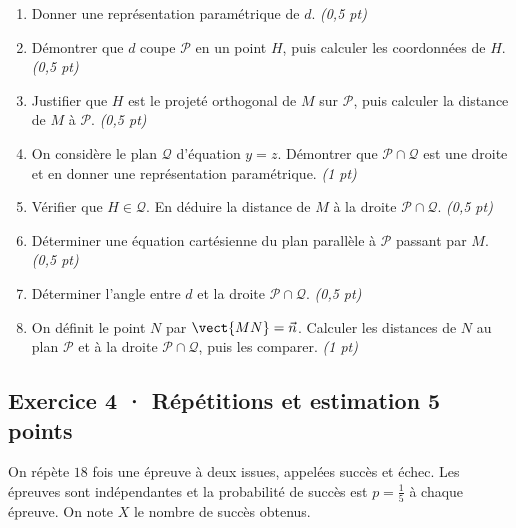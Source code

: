 \begin{enumerate}

\item Donner une représentation paramétrique de $d$. \hfill\textit{(0{,}5 pt)}

\item Démontrer que $d$ coupe $\mathcal P$ en un point $H$, puis calculer les coordonnées de $H$. \hfill\textit{(0{,}5 pt)}

\item Justifier que $H$ est le projeté orthogonal de $M$ sur $\mathcal P$, puis calculer la distance de $M$ à $\mathcal P$. \hfill\textit{(0{,}5 pt)}

\item On considère le plan $\mathcal Q$ d'équation $y=z$. Démontrer que $\mathcal P\cap\mathcal Q$ est une droite et en donner une représentation paramétrique. \hfill\textit{(1 pt)}

\item Vérifier que $H\in\mathcal Q$. En déduire la distance de $M$ à la droite $\mathcal P\cap\mathcal Q$. \hfill\textit{(0{,}5 pt)}

\item Déterminer une équation cartésienne du plan parallèle à $\mathcal P$ passant par $M$. \hfill\textit{(0{,}5 pt)}

\item Déterminer l'angle entre $d$ et la droite $\mathcal P\cap\mathcal Q$. \hfill\textit{(0{,}5 pt)}

\item On définit le point $N$ par $\vect{MN}=\vec n$. Calculer les distances de $N$ au plan $\mathcal P$ et à la droite $\mathcal P\cap\mathcal Q$, puis les comparer. \hfill\textit{(1 pt)}

\end{enumerate}

\subsection*{Exercice 4 · Répétitions et estimation \hfill 5 points}On répète $18$ fois une épreuve à deux issues, appelées succès et échec. Les épreuves sont indépendantes et la probabilité de succès est $p=\frac{1}{5}$ à chaque épreuve. On note $X$ le nombre de succès obtenus.


